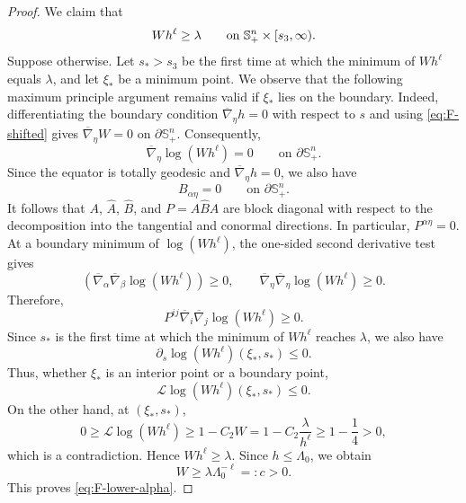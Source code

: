 \documentclass[10pt,a4paper]{amsart}
\newcommand{\Sph}{\mathbb S}
\begin{document}
\begin{proof}
We claim that
\begin{equation*}
        Wh^\ell\ge\lambda
        \qquad\hbox{on }\Sph^n_+\times[s_3,\infty).
\end{equation*}
Suppose otherwise.  Let $s_*>s_3$ be the first time at which the minimum of
$Wh^\ell$ equals $\lambda$, and let $\xi_*$ be a minimum point.  
We observe that the following maximum principle argument remains
valid if $\xi_*$ lies on the boundary. Indeed, differentiating the
boundary condition $\overline{\nabla}_{\eta}h=0$ with respect to $s$
and using \eqref{eq:F-shifted}  
gives $\overline{\nabla}_{\eta}W=0$ on $\partial\mathbb S^n_+$.
Consequently,
\begin{equation*}
    \overline{\nabla}_{\eta}\log(Wh^\ell)=0
    \qquad\text{on }\partial\mathbb S^n_+.
\end{equation*}
Since the equator is totally geodesic and
$\overline{\nabla}_{\eta}h=0$, we also have
\begin{equation*}
    B_{\alpha\eta}=0
    \qquad\text{on }\partial\mathbb S^n_+.
\end{equation*}
It follows that $A$, $\widehat A$, $\widehat B$, and
$P=A\widehat BA$ are block diagonal with respect to the decomposition
into the tangential and conormal directions. In particular, $P^{\alpha\eta}=0$. 
At a boundary minimum of $\log(Wh^\ell)$, the one-sided second derivative
test gives
\begin{equation*}
    \left(\overline{\nabla}_{\alpha}
    \overline{\nabla}_{\beta}\log(Wh^\ell)\right)\geq0,
    \qquad
    \overline{\nabla}_{\eta}
    \overline{\nabla}_{\eta}\log(Wh^\ell)\geq0.
\end{equation*}
Therefore,
\begin{equation*}
    P^{ij}\overline{\nabla}_i
    \overline{\nabla}_j\log(Wh^\ell)\geq0.
\end{equation*}
Since $s_*$ is the first time at which the minimum of $Wh^\ell$
reaches $\lambda$, we also have
\begin{equation*}
    \partial_s\log(Wh^\ell)(\xi_*,s_*)\leq0.
\end{equation*}
Thus, whether $\xi_*$ is an interior point or a boundary point,
\begin{equation*}
    \mathcal L\log(Wh^\ell)(\xi_*,s_*)\leq0.
\end{equation*}
On the other hand, at $(\xi_*,s_*)$,
\begin{equation*}
    0
    \geq \mathcal L\log(Wh^\ell)
    \geq 1-C_2W
    =1-C_2\frac{\lambda}{h^\ell}
    \geq 1-\frac14
    >0,
\end{equation*}
which is a contradiction. Hence $Wh^\ell\ge\lambda$.  Since $h\le\Lambda_0$,
we obtain
\begin{equation*}
        W\ge \lambda\Lambda_0^{-\ell}=:c>0.
\end{equation*}
This proves \eqref{eq:F-lower-alpha}.
\end{proof}
\end{document}
